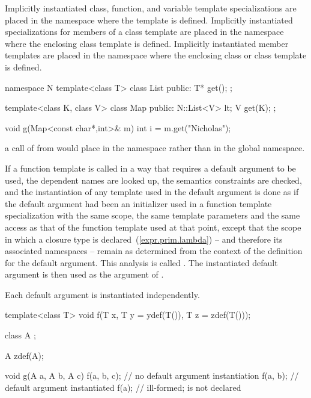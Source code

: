 \pnum
Implicitly instantiated class, function, and variable template specializations
are placed in the namespace where the template is defined.
Implicitly instantiated specializations for members of a class template are
placed in the namespace where the enclosing class template is defined.
Implicitly instantiated member templates are placed in the namespace where the
enclosing class or class template is defined.
\enterexample

\begin{codeblock}
namespace N {
  template<class T> class List {
  public:
    T* get();
  };
}

template<class K, class V> class Map {
public:
  N::List<V> lt;
  V get(K);
};

void g(Map<const char*,int>& m) {
  int i = m.get("Nicholas");
}
\end{codeblock}

a call of
from
would place
in the namespace
rather than in the global namespace.
\exitexample

\pnum
If a function template
is called in a way that requires a default argument to be used,
the dependent names are looked up, the semantics constraints are checked,
and the instantiation of any template used in the default argument
is done as if the default argument had been
an initializer used in a function template specialization with the same scope,
the same template parameters and the same access as that of the function template
used at that point, except that the scope in which a closure type is
declared~(\ref{expr.prim.lambda}) -- and therefore its associated namespaces --
remain as determined from the context of the definition for the default
argument.
This analysis is called
.
The instantiated default argument is then used as the argument of
.

\pnum
Each default argument is instantiated independently.
\enterexample

\begin{codeblock}
template<class T> void f(T x, T y = ydef(T()), T z = zdef(T()));

class  A { };

A zdef(A);

void g(A a, A b, A c) {
  f(a, b, c);       // no default argument instantiation
  f(a, b);          // default argument  instantiated
  f(a);             // ill-formed;  is not declared
}
\end{codeblock}
\exitexample

